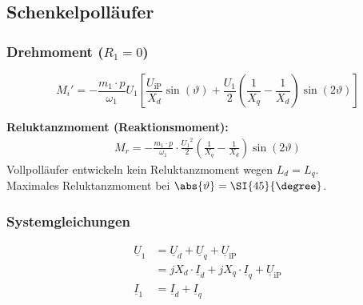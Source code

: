 \begin{sectionbox}
\subsection{Schenkelpolläufer}
\subsubsection{Drehmoment ($R_1 = 0$)}
\begin{emphbox}
\[M_i' = -\frac{m_1\cdot p}{\omega_1} U_1\left[\frac{U_\text{iP}}{X_d}\sin(\vartheta) + \frac{U_1}{2}\left(\frac{1}{X_q} - \frac{1}{X_d}\right)\sin(2\vartheta)\right]\]
\end{emphbox}
\textbf{Reluktanzmoment (Reaktionsmoment):}
\begin{align*}
M_r = -\frac{m_1\cdot p}{\omega_1}\cdot\frac{{U_1}^2}{2}\left(\frac{1}{X_q} - \frac{1}{X_d}\right)\sin(2\vartheta)
\end{align*}
Vollpolläufer entwickeln kein Reluktanzmoment wegen $L_d = L_q$.\\
Maximales Reluktanzmoment bei $\abs{\vartheta} = \SI{45}{\degree}$.

\subsubsection{Systemgleichungen}
\begin{align*}
\underline{U}_1 &= \underline{U}_d + \underline{U}_q + \underline{U}_\text{iP}\\
&= jX_d\cdot\underline{I}_d + jX_q\cdot\underline{I}_q + \underline{U}_\text{iP}\\
\underline{I}_1 &= \underline{I}_d + \underline{I}_q
\end{align*}
\end{sectionbox}

